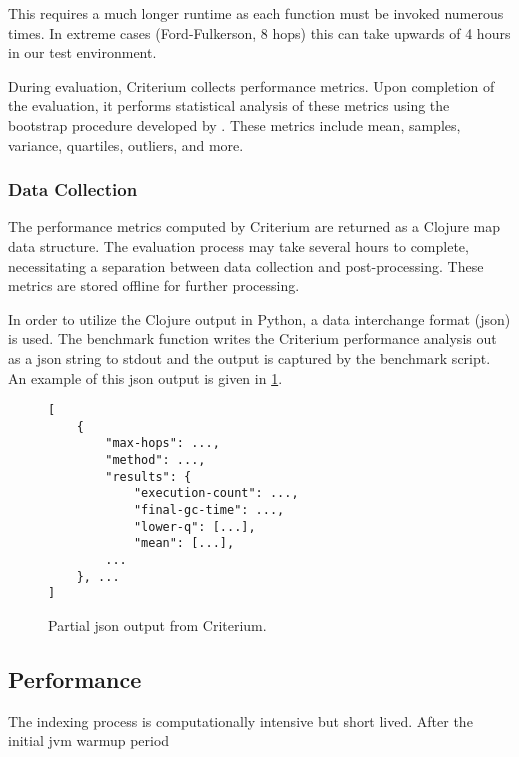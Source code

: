 			This requires a much longer runtime as each function must be invoked numerous times.  In extreme cases (Ford-Fulkerson, 8 hops) this can take upwards of 4 hours in our test environment.
			
			During evaluation, Criterium collects performance metrics.  Upon completion of the evaluation, it performs statistical analysis of these metrics using the bootstrap procedure developed by \citeauthor{efron-87} \cite{efron-87}.  These metrics include mean, samples, variance, quartiles, outliers, and more.
		
			\subsubsection{Data Collection}
			\label{sec:data-collection}
				The performance metrics computed by Criterium are returned as a Clojure map data structure.  The evaluation process may take several hours to complete, necessitating a separation between data collection and post-processing.  These metrics are stored offline for further processing.
				
				In order to utilize the Clojure output in Python, a data interchange format (\gls{json}) is used.  The benchmark function writes the Criterium performance analysis out as a \gls{json} string to stdout and the output is captured by the benchmark script.  An example of this \gls{json} output is given in \cref{fig:criterium-json-output}.
				
				\begin{figure}[H]
					\centering %
					\begin{verbatim}
[
    {
        "max-hops": ...,
        "method": ...,
        "results": {
            "execution-count": ...,
            "final-gc-time": ...,
            "lower-q": [...],
            "mean": [...],
        ...
    }, ...
]
					\end{verbatim}
					
					\caption{Partial \gls{json} output from Criterium.}
					\label{fig:criterium-json-output}
				\end{figure}
		
		\subsection{Performance}
			The indexing process is computationally intensive but short lived.  After the initial \gls{jvm} warmup period
			
			
			
			
